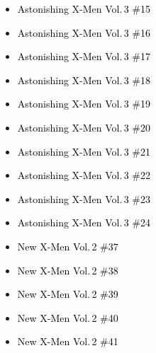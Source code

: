 \documentclass[12pt]{article}
\newcommand{\checkbox}{\raisebox{0.0ex}{\fbox{\rule{0ex}{1.5ex} \rule{1.5ex}{0ex}}}}
\begin{document}
\vspace{0.3cm}
\noindent
\begin{tcolorbox}[
  colback=white!95!gray,
  colframe=black,
  width=\textwidth,
  arc=4mm,
  auto outer arc,
  boxrule=0.8pt,
  left=8pt,right=8pt,top=8pt,bottom=8pt
]
\begin{itemize}[left=0pt,label={\checkbox}]
  \item \textcolor{black}{Astonishing X-Men Vol.\,3 \#15}
  \item \textcolor{black}{Astonishing X-Men Vol.\,3 \#16}
  \item \textcolor{black}{Astonishing X-Men Vol.\,3 \#17}
  \item \textcolor{black}{Astonishing X-Men Vol.\,3 \#18}
  \item \textcolor{black}{Astonishing X-Men Vol.\,3 \#19}
  \item \textcolor{black}{Astonishing X-Men Vol.\,3 \#20}
  \item \textcolor{black}{Astonishing X-Men Vol.\,3 \#21}
  \item \textcolor{black}{Astonishing X-Men Vol.\,3 \#22}
  \item \textcolor{black}{Astonishing X-Men Vol.\,3 \#23}
  \item \textcolor{black}{Astonishing X-Men Vol.\,3 \#24}
  \item \textcolor{black}{New X-Men Vol.\,2 \#37}
  \item \textcolor{black}{New X-Men Vol.\,2 \#38}
  \item \textcolor{black}{New X-Men Vol.\,2 \#39}
  \item \textcolor{black}{New X-Men Vol.\,2 \#40}
  \item \textcolor{black}{New X-Men Vol.\,2 \#41}
\end{itemize}
\end{tcolorbox}

\newpage
{}
\end{document}
